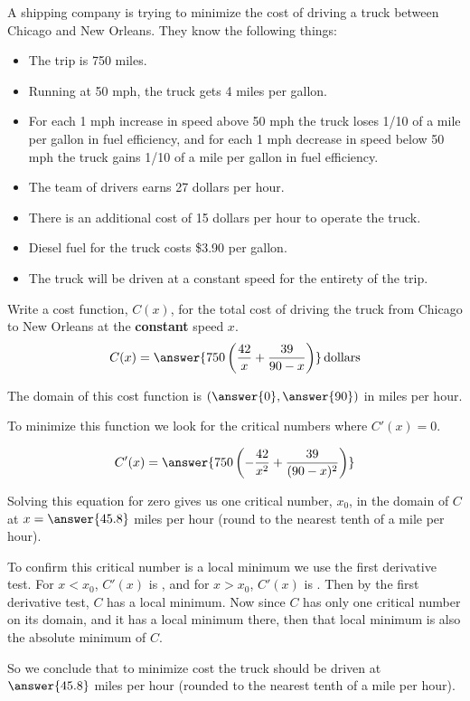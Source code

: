\documentclass{ximera}
\author{Nela Lakos \and Kyle Parsons}
\begin{document}
\begin{exercise}

A shipping company is trying to minimize the cost of driving a truck between Chicago and New Orleans.  They know the following things:
\begin{itemize}
\item The trip is 750 miles.
\item Running at 50 mph, the truck gets 4 miles per gallon.
\item For each 1 mph increase in speed above 50 mph the truck loses 1/10 of a mile per gallon in fuel efficiency, and for each 1 mph decrease in speed below 50 mph the truck gains 1/10 of a mile per gallon in fuel efficiency.
\item The team of drivers earns 27 dollars per hour.
\item There is an additional cost of 15 dollars per hour to operate the truck.
\item Diesel fuel for the truck costs \$3.90 per gallon.
\item The truck will be driven at a constant speed for the entirety of the trip.
\end{itemize}

Write a cost function, $C(x)$, for the total cost of driving the truck from Chicago to New Orleans at the \textbf{constant} speed $x$.
\[
C(x) = \answer{750\left(\frac{42}{x}+\frac{39}{90-x}\right)}\,\text{dollars}
\]

The domain of this cost function is $\left(\answer{0},\answer{90}\right)$ in miles per hour.

To minimize this function we look for the critical numbers where $C'(x)=0$.  

\[
C'(x) = \answer{750\left(-\frac{42}{x^2} + \frac{39}{(90-x)^2}\right)}
\]

Solving this equation for zero gives us one critical number, $x_0$, in the domain of $C$ at $x=\answer{45.8}$ miles per hour (round to the nearest tenth of a mile per hour).

To confirm this critical number is a local minimum we use the first derivative test.  For $x<x_0$, $C'(x)$ is , and for $x>x_0$, $C'(x)$ is .  Then by the first derivative test, $C$ has a local minimum.  Now since $C$ has only one critical number on its domain, and it has a local minimum there, then that local minimum is also the absolute minimum of $C$.

So we conclude that to minimize cost the truck should be driven at $\answer{45.8}$ miles per hour (rounded to the nearest tenth of a mile per hour).

\end{exercise}
\end{document}
